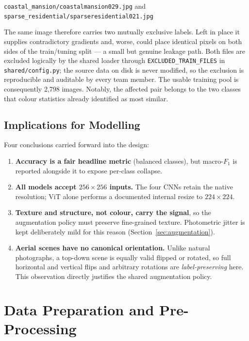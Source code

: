 \documentclass[11pt,twoside,a4paper]{article}
\begin{document}
\begin{center}
\texttt{coastal\_mansion/coastalmansion029.jpg} \quad and \quad
\texttt{sparse\_residential/sparseresidential021.jpg}
\end{center}

The same image therefore carries two mutually exclusive labels. Left in place
it supplies contradictory gradients and, worse, could place identical pixels on
both sides of the train/tuning split --- a small but genuine leakage path.
Both files are excluded logically by the shared loader through
\texttt{EXCLUDED\_TRAIN\_FILES} in \texttt{shared/config.py}; the source data on
disk is never modified, so the exclusion is reproducible and auditable by every
team member. The usable training pool is consequently 2{,}798 images. Notably,
the affected pair belongs to the two classes that colour statistics already
identified as most similar.

\subsection{Implications for Modelling}

Four conclusions carried forward into the design:

\begin{enumerate}
  \item \textbf{Accuracy is a fair headline metric} (balanced classes), but
    macro-$F_1$ is reported alongside it to expose per-class collapse.
  \item \textbf{All models accept $256 \times 256$ inputs.} The four CNNs retain
    the native resolution; ViT alone performs a documented internal resize to
    $224 \times 224$.
  \item \textbf{Texture and structure, not colour, carry the signal}, so the
    augmentation policy must preserve fine-grained texture. Photometric jitter is kept deliberately mild for this reason
    (Section~\ref{sec:augmentation}).
  \item \textbf{Aerial scenes have no canonical orientation.} Unlike natural
    photographs, a top-down scene is equally valid flipped or rotated, so full
    horizontal and vertical flips and arbitrary rotations are
    \emph{label-preserving} here. This observation directly justifies the
    shared augmentation policy.
\end{enumerate}

\section{Data Preparation and Pre-Processing}
\end{document}
